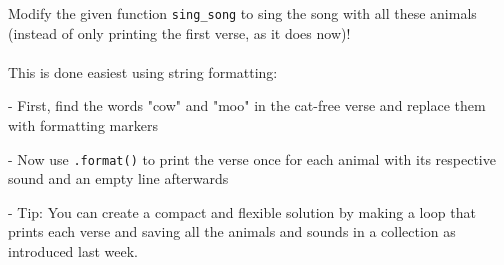 \noindent Modify the given function  \texttt{sing\_song} to sing the song with all these animals (instead of only printing the first verse, as it does now)!\\\\
This is done easiest using string formatting:\\
\begin{description}
  \item - First, find the words "cow" and "moo" in the cat-free verse and replace them with formatting markers
  \item - Now use \texttt{.format()} to print the verse once for each animal with its respective sound and an empty line afterwards
  \item - Tip: You can create a compact and flexible solution by making a loop that prints each verse and saving all the animals and sounds in a collection as introduced last week.
\end{description}

\cprotect{}


